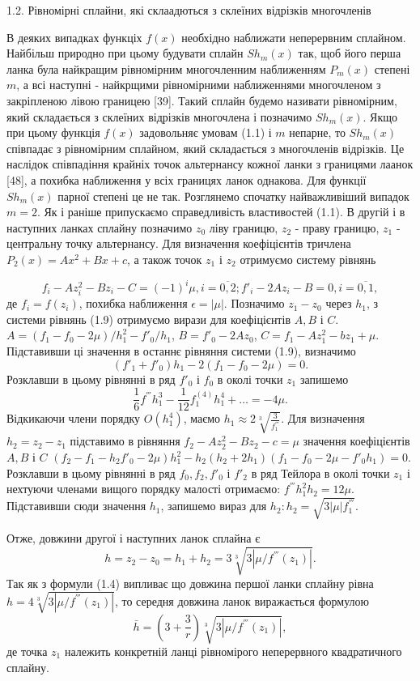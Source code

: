 \documentclass[ukrainian,14pt]{extarticle}
\begin{document}
1.2. Рівномірні сплайни, які склаадються з склеїних відрізків многочленів

В деяких випадках функціх $f(x)$ необхідно наближати неперервним сплайном. Найбільш природно при цьому будувати сплайн $S h_m(x)$ так, щоб його перша ланка була найкращим рівномірним многочленним наближенням $P_m(x)$ степені $m$, а всі наступні - найкрщими рівномірними наближеннями многочленом з закріпленою лівою границею [39]. Такий сплайн будемо називати рівномірним, який складається з склеїних відрізків многочлена і позначимо $S h_m(x)$. Якщо при цьому функція $f(x)$ задовольняє умовам (1.1) і $m$ непарне, то $S h_m(x)$ співпадає з рівномірним сплайном, який складається з многочленів відрізків. Це наслідок співпадіння крайніх точок альтернансу кожної ланки з границями лаанок [48], а похибка наближення у всіх границях ланок однакова. Для функції $S h_m(x)$ парної степені це не так. Розглянемо спочатку найважливіший випадок $m = 2$. Як і раніше припускаємо справедливість властивостей (1.1).  В другій і в наступних ланках сплайну позначимо $z_0$ ліву границю, $z_2$ - праву границю, $z_1$ - центральну точку альтернансу. Для визначення коефіцієнтів тричлена $P_2(x) = Ax^2 + Bx + c$, а також точок $z_1$ і $z_2$ отримуємо систему рівнянь

$$f_i - Az^2_i - Bz_i - C = (-1)^i \mu, i = \overline{0,2}; f'_i - 2Az_i - B = 0, i = \overline{0, 1},$$де $f_i = f(z_i)$, похибка наближення $\epsilon = |\mu|$. Позначимо $z_1 - z_0$ через $h_1$, з системи рівнянь (1.9) отримуємо вирази для коефіцієнтів $A, B$ і $C$. $A = (f_1 - f_0 - 2\mu) / h_1^2 - f'_0 / h_1$, $B=f'_0 - 2Az_0$, $C = f_1 - Az_1^2 - bz_1 + \mu$. Підставивши ці значення в останнє рівняння системи (1.9), визначимо
$$(f'_1 + f'_0) h_1 - 2(f_1 - f_0 -2\mu) = 0.$$
Розклавши в цьому рівнянні в ряд $f'_0$ і $f_0$ в околі точки $z_1$ запишемо
$$\frac{1}{6}f^{'''}h^3_1 - \frac{1}{12} f_1^{(4)}h_1^4 + \ldots = -4\mu.$$
Відкикаючи члени порядку $O(h_1^4)$, маємо $h_1 \approx 2 \sqrt[3]{\frac{3}{f^{'''}_1}}$. Для визначення $h_2 = z_2 - z_1$ підставимо в рівняння $f_2 - Az_2^2 - Bz_2 - c = \mu$ значення коефіцієнтів $A, B$ і $C$
$(f_2 - f_1 - h_2 f'_0 - 2\mu) h_1^2 - h_2(h_2 + 2h_1)(f_1 - f_0 - 2\mu - f'_0h_1) = 0.$
Розклавши в цьому рівнянні в ряд $f_0, f_2, f'_0$ і $f'_2$ в ряд Тейлора в околі точки $z_1$ і нехтуючи членами вищого порядку малості отримаємо: $f^{'''}h^2_1 h_2 = 12\mu$. Підставивши сюди значення $h_1$, запишемо вираз для $h_2: h_2 = \sqrt{3 |\mu| f^{'''}_1}$.

Отже, довжини другої і наступних ланок сплайна є
$$h = z_2 - z_0 = h_1 + h_2 = 3 \sqrt[3]{3 |\mu / f^{'''}(z_1)|}.$$ Так як з формули (1.4) випливає що довжина першої ланки сплайну рівна $h = 4\sqrt[3]{3 |\mu / f^{'''}(z_1)|}$, то середня довжина ланок виражається формулою
$$\bar{h} = \left(3 + \frac{3}{r}\right) \sqrt[3]{3 |\mu / f^{'''}(z_1)|}, $$ де точка $z_1$ належить конкретній ланці рівномірого неперервного квадратичного сплайну.
\end{document}
